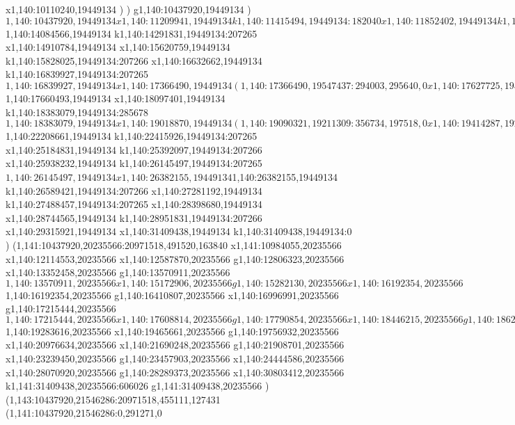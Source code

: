 {x1,140:10110240,19449134
)
)
g1,140:10437920,19449134
)
$1,140:10437920,19449134
x1,140:11209941,19449134
k1,140:11415494,19449134:182040
x1,140:11852402,19449134
k1,140:12034442,19449134:182040
x1,140:12507758,19449134
k1,140:12631016,19449134:123258
x1,140:13140742,19449134
k1,140:13264000,19449134:123258
x1,140:13790563,19449134
(1,140:13790563,19547437:294003,295640,0
x1,140:14051798,19547437
)
$1,140:14084566,19449134
k1,140:14291831,19449134:207265
x1,140:14910784,19449134
x1,140:15620759,19449134
k1,140:15828025,19449134:207266
x1,140:16632662,19449134
k1,140:16839927,19449134:207265
$1,140:16839927,19449134
x1,140:17366490,19449134
(1,140:17366490,19547437:294003,295640,0
x1,140:17627725,19547437
)
$1,140:17660493,19449134
x1,140:18097401,19449134
k1,140:18383079,19449134:285678
$1,140:18383079,19449134
x1,140:19018870,19449134
(1,140:19090321,19211309:356734,197518,0
x1,140:19414287,19211309
)
x1,140:20109849,19449134
x1,140:20315407,19449134
k1,140:20424631,19449134:109224
x1,140:20861539,19449134
k1,140:21043579,19449134:182040
x1,140:21698940,19449134
k1,140:21880980,19449134:182040
x1,140:22208661,19449134
$1,140:22208661,19449134
k1,140:22415926,19449134:207265
x1,140:25184831,19449134
k1,140:25392097,19449134:207266
x1,140:25938232,19449134
k1,140:26145497,19449134:207265
$1,140:26145497,19449134
x1,140:26382155,19449134
$1,140:26382155,19449134
k1,140:26589421,19449134:207266
x1,140:27281192,19449134
k1,140:27488457,19449134:207265
x1,140:28398680,19449134
x1,140:28744565,19449134
k1,140:28951831,19449134:207266
x1,140:29315921,19449134
x1,140:31409438,19449134
k1,140:31409438,19449134:0
)
(1,141:10437920,20235566:20971518,491520,163840
x1,141:10984055,20235566
x1,140:12114553,20235566
x1,140:12587870,20235566
g1,140:12806323,20235566
x1,140:13352458,20235566
g1,140:13570911,20235566
$1,140:13570911,20235566
x1,140:15172906,20235566
g1,140:15282130,20235566
x1,140:16192354,20235566
$1,140:16192354,20235566
g1,140:16410807,20235566
x1,140:16996991,20235566
g1,140:17215444,20235566
$1,140:17215444,20235566
x1,140:17608814,20235566
g1,140:17790854,20235566
x1,140:18446215,20235566
g1,140:18628255,20235566
x1,140:19283616,20235566
$1,140:19283616,20235566
x1,140:19465661,20235566
g1,140:19756932,20235566
x1,140:20976634,20235566
x1,140:21690248,20235566
g1,140:21908701,20235566
x1,140:23239450,20235566
g1,140:23457903,20235566
x1,140:24444586,20235566
x1,140:28070920,20235566
g1,140:28289373,20235566
x1,140:30803412,20235566
k1,141:31409438,20235566:606026
g1,141:31409438,20235566
)
(1,143:10437920,21546286:20971518,455111,127431
(1,141:10437920,21546286:0,291271,0
}
